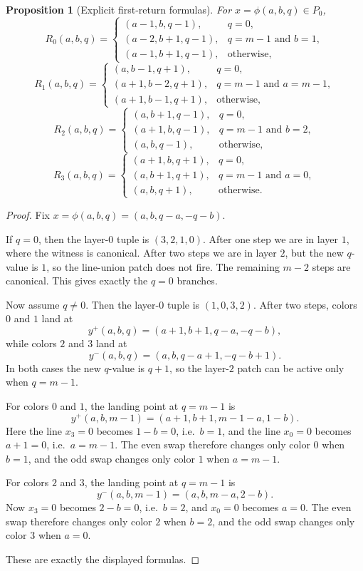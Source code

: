 \documentclass[11pt]{article}
\newtheorem{proposition}[theorem]{Proposition}
\newcommand{\Pzero}{P_0}
\begin{document}
\begin{proposition}[Explicit first-return formulas]\label{prop:R}
For $x=\phi(a,b,q)\in \Pzero$,
\[
R_0(a,b,q)=
\begin{cases}
(a-1,b,q-1), & q=0,\\
(a-2,b+1,q-1), & q=m-1 \text{ and } b=1,\\
(a-1,b+1,q-1), & \text{otherwise,}
\end{cases}
\]
\[
R_1(a,b,q)=
\begin{cases}
(a,b-1,q+1), & q=0,\\
(a+1,b-2,q+1), & q=m-1 \text{ and } a=m-1,\\
(a+1,b-1,q+1), & \text{otherwise,}
\end{cases}
\]
\[
R_2(a,b,q)=
\begin{cases}
(a,b+1,q-1), & q=0,\\
(a+1,b,q-1), & q=m-1 \text{ and } b=2,\\
(a,b,q-1), & \text{otherwise,}
\end{cases}
\]
\[
R_3(a,b,q)=
\begin{cases}
(a+1,b,q+1), & q=0,\\
(a,b+1,q+1), & q=m-1 \text{ and } a=0,\\
(a,b,q+1), & \text{otherwise.}
\end{cases}
\]
\end{proposition}

\begin{proof}
Fix $x=\phi(a,b,q)=(a,b,q-a,-q-b)$.

If $q=0$, then the layer-$0$ tuple is $(3,2,1,0)$. After one step we are in
layer $1$, where the witness is canonical. After two steps we are in layer $2$,
but the new $q$-value is $1$, so the line-union patch does not fire. The
remaining $m-2$ steps are canonical. This gives exactly the $q=0$ branches.

Now assume $q \neq 0$. Then the layer-$0$ tuple is $(1,0,3,2)$. After two steps,
colors $0$ and $1$ land at
\[
y^+(a,b,q)=(a+1,b+1,q-a,-q-b),
\]
while colors $2$ and $3$ land at
\[
y^-(a,b,q)=(a,b,q-a+1,-q-b+1).
\]
In both cases the new $q$-value is $q+1$, so the layer-$2$ patch can be active
only when $q=m-1$.

For colors $0$ and $1$, the landing point at $q=m-1$ is
\[
y^+(a,b,m-1)=(a+1,b+1,m-1-a,1-b).
\]
Here the line $x_3=0$ becomes $1-b=0$, i.e.\ $b=1$, and the line $x_0=0$ becomes
$a+1=0$, i.e.\ $a=m-1$. The even swap therefore changes only color $0$ when
$b=1$, and the odd swap changes only color $1$ when $a=m-1$.

For colors $2$ and $3$, the landing point at $q=m-1$ is
\[
y^-(a,b,m-1)=(a,b,m-a,2-b).
\]
Now $x_3=0$ becomes $2-b=0$, i.e.\ $b=2$, and $x_0=0$ becomes $a=0$. The even
swap therefore changes only color $2$ when $b=2$, and the odd swap changes only
color $3$ when $a=0$.

These are exactly the displayed formulas.
\end{proof}
\end{document}
